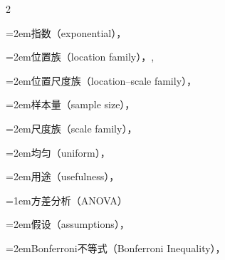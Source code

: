 \begin{multicols}{2}
\par\noindent\hangindent=2em\hspace*{1em}\label{idx:19}指数（exponential），\hyperref[ex:6.2.26]{\pageref*{ex:6.2.26}}\par
\par\noindent\hangindent=2em\hspace*{1em}\label{idx:20}位置族（location family），\hyperref[ex:6.2.18]{\pageref*{ex:6.2.18}}, \hyperref[exercise:6.11]{\pageref*{exercise:6.11}}\par
\par\noindent\hangindent=2em\hspace*{1em}\label{idx:21}位置尺度族（location–scale family），\hyperref[exercise:6.40]{\pageref*{exercise:6.40}}\par
\par\noindent\hangindent=2em\hspace*{1em}\label{idx:22}样本量（sample size），\hyperref[exercise:6.12]{\pageref*{exercise:6.12}}\par
\par\noindent\hangindent=2em\hspace*{1em}\label{idx:23}尺度族（scale family），\hyperref[ex:6.2.19]{\pageref*{ex:6.2.19}}\par
\par\noindent\hangindent=2em\hspace*{1em}\label{idx:24}均匀（uniform），\hyperref[ex:6.2.17]{\pageref*{ex:6.2.17}}\par
\par\noindent\hangindent=2em\hspace*{1em}\label{idx:25}用途（usefulness），\hyperref[ex:6.2.20]{\pageref*{ex:6.2.20}}\par
\par\addvspace{2pt}
\par\noindent\hangindent=1em\hspace*{0em}\label{idx:26}方差分析（ANOVA）\par
\par\noindent\hangindent=2em\hspace*{1em}\label{idx:27}假设（assumptions），\hyperref[sec:11.2.1]{\pageref*{sec:11.2.1}}\par
\par\noindent\hangindent=2em\hspace*{1em}\label{idx:28}Bonferroni不等式（Bonferroni Inequality），\hyperref[ex:11.2.9]{\pageref*{ex:11.2.9}}\par

\end{multicols}
